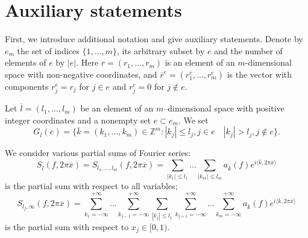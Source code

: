 \documentclass[12pt]{article}
\def\le {\leqslant}
\theoremstyle{plain}
\begin{document}
\section{Auxiliary statements}\label{sec1}  %

\smallskip

First, we introduce additional notation and give auxiliary statements.
Denote by $e_{m}$ the set of indices $\{1, \dots, m\}$, its arbitrary subset by $e$ and the number of elements of $e$ by $|e|$.
Here $\overline{r} =(r_{1},\ldots,r_{m})$ is an element of an $m$-dimensional space with
non-negative coordinates, and $\overline{r}^{e} =(r_{1}^{e},\ldots,r_{m}^{e})$
is the vector with components $r_{j}^{e} = r_{j}$ for $j\in e$ and $r_{j}^{e}= 0$ for $j\notin e.$

Let $\overline{l} = (l_{1},\ldots,l_{m})$ be an element of an $m$--dimensional space with
positive integer coordinates and a nonempty set $e\subset e_{m}.$
We set 
 \begin{equation*}
G_{\overline{l}}(e) = \{ \overline{k} = (k_{1},\ldots,k_{m})\in \mathbb{Z}^{m} :
|k_{j}|\le l_{j}, j\in e \quad |k_{j}| > l_{j}, j\notin e \}.
\end{equation*}

We consider various partial sums of Fourier series:
 \begin{equation*}
S_{\overline{l}}(f, 2\pi\overline{x}) = S_{l_{1},\ldots,l_{m}}(f, 2\pi\overline{x}) =
\sum\limits_{|k_{1}|\le l_{1}}\ldots\sum\limits_{|k_{m}|\le l_{m} }
a_{\overline{k}} (f) e^{i\langle\overline{k} , 2\pi\overline{x}\rangle}
 \end{equation*}
is the partial sum with respect to all variables;
 \begin{equation*}
S_{l_{j}, \infty}(f, 2\pi\overline{x}) = \sum\limits_{k_{1}=-\infty }^{+\infty}\ldots \sum\limits_{k_{j-1}=-\infty}^{+\infty}
\sum\limits_{|k_{j}|\le l_{1}}\sum\limits_{k_{j+1}=-\infty }^{+\infty}\ldots\sum\limits_{k_{m}=-\infty}^{+\infty}
a_{\overline{k}}(f) e^{i\langle\overline{k} , 2\pi\overline{x}\rangle}
 \end{equation*}
is the partial sum with respect to $ x_{j}\in [0, 1)$. 
\end{document}
